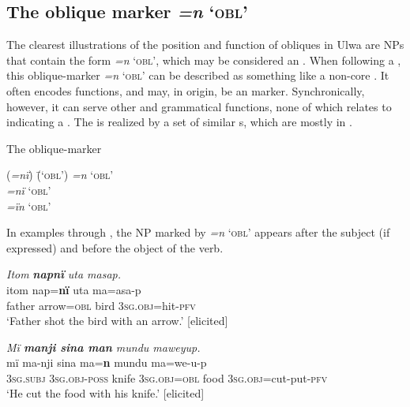 
\subsection{The oblique marker \textit{=n} ‘\textsc{obl}’}\label{sec:11.4.1}


The clearest illustrations of the position and function of obliques in Ulwa are NPs that contain the  form \textit{=n} ‘\textsc{obl}’, which may be considered an . When following a , this oblique-marker  \textit{=n} ‘\textsc{obl}’ can be described as something like a non-core . It often encodes  functions, and may, in origin, be an  marker. Synchronically, however, it can serve other  and grammatical functions, none of which relates to indicating a . The  is realized by a set of similar s, which are mostly in  .

\ea%
    \label{ex:clause:59}
          The oblique-marker \\
\begin{tabbing}
{(\textit{=nï})} \= {(‘\textsc{obl}’)}\kill
{\textit{=n}} \> {‘\textsc{obl}’}\\
{\textit{=nï}} \> {‘\textsc{obl}}’\\
{\textit{=ïn}} \> {‘\textsc{obl}}’
\end{tabbing}
\z

In examples  through , the  NP marked by \textit{=n} ‘\textsc{obl}’ appears after the subject (if expressed) and before the object of the verb.

\ea%
    \label{ex:clause:60}
          \textit{Itom} \textbf{\textit{napnï}} \textit{uta masap.}\\
\gll    itom  nap=\textbf{nï}      uta    ma=asa-p\\
    father  arrow=\textsc{obl}  bird  3\textsc{sg.obj}=hit-\textsc{pfv}\\
\glt `Father shot the bird with an arrow.’ [elicited]
\z

\ea%
    \label{ex:clause:61}
          \textit{Mï \textbf{manji sina man} mundu maweyup.}\\
\gll    mï      ma-nji      sina  ma=\textbf{n}      mundu ma=we-u-p\\
    3\textsc{sg.subj}  3\textsc{sg.obj-poss}  knife  3\textsc{sg.obj=obl}  food    3\textsc{sg.obj}=cut-put-\textsc{pfv}\\
\glt `He cut the food with his knife.’ [elicited]
\z

